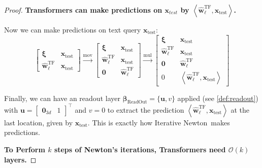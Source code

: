 \documentclass[11pt]{article}
\theoremstyle{plain}
\theoremstyle{definition}
\theoremstyle{remark}
\newcommand{\zero}{\boldsymbol{0}}
\renewcommand{\^}[1]{^{(#1)}}
\newcommand{\bx}{\boldsymbol{x}}
\newcommand{\bxi}{\boldsymbol{\xi}}
\newcommand{\bu}{\boldsymbol{u}}
\newcommand{\bw}{\boldsymbol{w}}
\newcommand{\bbeta}{\boldsymbol{\beta}}
\newcommand{\inner}[1]{ \left\langle {#1} \right\rangle }
\newcommand{\newton}{Iterative Newton}
\renewcommand{\paragraph}[1]{\vspace{1mm}\noindent\textbf{#1}}
\begin{document}
\begin{proof}
\paragraph{Transformers can make predictions on $\bx_{test}$ by $\inner{\hat{\bw}_\ell^\mathrm{TF}, \bx_\mathrm{test}}$.} 

Now we can make predictions on text query $\bx_\mathrm{test}$:
\begin{equation}
    \begin{bmatrix}
        \bxi &  \bx_\mathrm{test} \\
        \hat{\bw}_\ell^\mathrm{TF} & \bx_\mathrm{test}
    \end{bmatrix} \overset{\mathrm{mov}}{\longrightarrow} \begin{bmatrix}
        \bxi &  \bx_\mathrm{test} \\
        \hat{\bw}_\ell^\mathrm{TF} & \bx_\mathrm{test} \\
        \zero & \hat{\bw}_\ell^\mathrm{TF}
    \end{bmatrix} \overset{\mathrm{mul}}{\longrightarrow} \begin{bmatrix}
        \bxi &  \bx_\mathrm{test} \\
        \hat{\bw}_\ell^\mathrm{TF} & \bx_\mathrm{test} \\
        \zero & \hat{\bw}_\ell^\mathrm{TF} \\
        0 & \inner{\hat{\bw}_\ell^\mathrm{TF}, \bx_\mathrm{test}}
    \end{bmatrix}
\end{equation}

Finally, we can have an readout layer $\bbeta_\mathrm{ReadOut} = \{\bu, v\}$ applied (see \cref{def:readout}) with $\bu = \begin{bmatrix}
    \zero_{3d} & 1 
\end{bmatrix}^\top$ and $v = 0$ to extract the prediction $ \inner{\hat{\bw}_\ell^\mathrm{TF}, \bx_\mathrm{test}}$ at the last location, given by $\bx_\mathrm{test}$. This is exactly how \newton\ makes predictions. 

\paragraph{To Perform $k$ steps of Newton's iterations, Transformers need $\mathcal O(k)$ layers.}


\end{proof}
\end{document}
